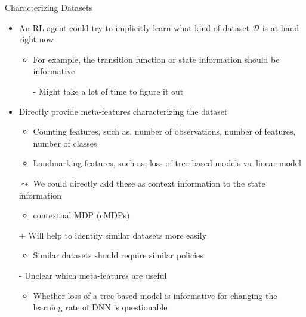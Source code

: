 \begin{frame}[c]{Characterizing Datasets}

	\begin{itemize}
	    \item An RL agent could try to implicitly learn what kind of dataset $\mathcal{D}$ is at hand right now
	    \begin{itemize}
	        \item For example, the transition function or state information should be informative
	        \item[-] Might take a lot of time to figure it out
	    \end{itemize}
	    \medskip
	    \pause
	    \item Directly provide meta-features characterizing the dataset
	    \begin{itemize}
	        \item Counting features, such as, number of observations, number of features, number of classes
	        \item Landmarking features, such as, loss of tree-based models vs. linear model
	    \end{itemize}
	    \item[$\leadsto$] We could directly add these as context information to the state information
	    \begin{itemize}
	        \item contextual MDP (cMDPs) 
	    \end{itemize}
	    \item[+] Will help to identify similar datasets more easily
	    \begin{itemize}
	        \item Similar datasets should require similar policies
	    \end{itemize}
	    \pause
	    \item[-] Unclear which meta-features are useful
	    \begin{itemize}
	        \item Whether loss of a tree-based model is informative for changing the learning rate of DNN is questionable
	    \end{itemize}
	    
	\end{itemize}	
	
\end{frame}

